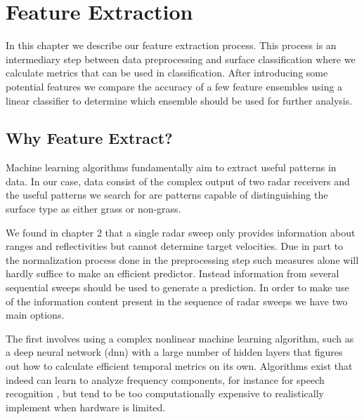 
\chapter{Feature Extraction}

In this chapter we describe our feature extraction process. This process is an intermediary step between data preprocessing and surface classification where we calculate metrics that can be used in classification. After introducing some potential features we compare the accuracy of a few feature ensembles using a linear classifier to determine which ensemble should be used for further analysis.  

\section{Why Feature Extract?}

Machine learning algorithms fundamentally aim to extract useful patterns in data. In our case, data consist of the complex output of two radar receivers and the useful patterns we search for are patterns capable of distinguishing the surface type as either grass or non-grass. %

We found in chapter 2 that a single radar sweep only provides information about ranges and reflectivities but cannot determine target velocities. Due in part to the normalization process done in the preprocessing step such measures alone will hardly suffice to make an efficient predictor. Instead information from several sequential sweeps should be used to generate a prediction. In order to make use of the information content present in the sequence of radar sweeps we have two main options. 

The first involves using a complex nonlinear machine learning algorithm, such as a deep neural network (\gls{dnn}) with a large number of hidden layers that figures out how to calculate efficient temporal metrics on its own. Algorithms exist that indeed can learn to analyze frequency components, for instance for speech recognition \citep{graves_mohamed_hinton_2013}, but tend to be too computationally expensive to realistically implement when hardware is limited.

